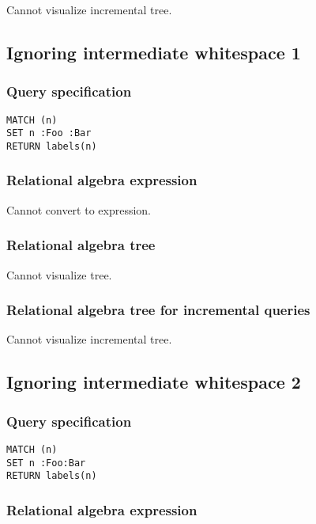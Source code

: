 Cannot visualize incremental tree.

\subsection{Ignoring intermediate whitespace 1}

\subsubsection*{Query specification}

\begin{lstlisting}
MATCH (n)
SET n :Foo :Bar
RETURN labels(n)
\end{lstlisting}

\subsubsection*{Relational algebra expression}

Cannot convert to expression.

\subsubsection*{Relational algebra tree}

Cannot visualize tree.

\subsubsection*{Relational algebra tree for incremental queries}

Cannot visualize incremental tree.

\subsection{Ignoring intermediate whitespace 2}

\subsubsection*{Query specification}

\begin{lstlisting}
MATCH (n)
SET n :Foo:Bar
RETURN labels(n)
\end{lstlisting}

\subsubsection*{Relational algebra expression}


